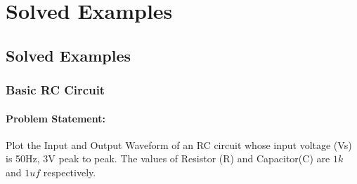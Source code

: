\chapter{Solved Examples}
\thispagestyle{empty}
\label{chap12}

\section{Solved Examples}

\subsection{Basic RC Circuit}
\subsubsection{Problem Statement:} Plot the Input and Output Waveform of an RC circuit whose input voltage (Vs) is 50Hz, 3V peak to peak. The values of Resistor (R) and Capacitor(C) are $1k$ and $1uf$ respectively.
